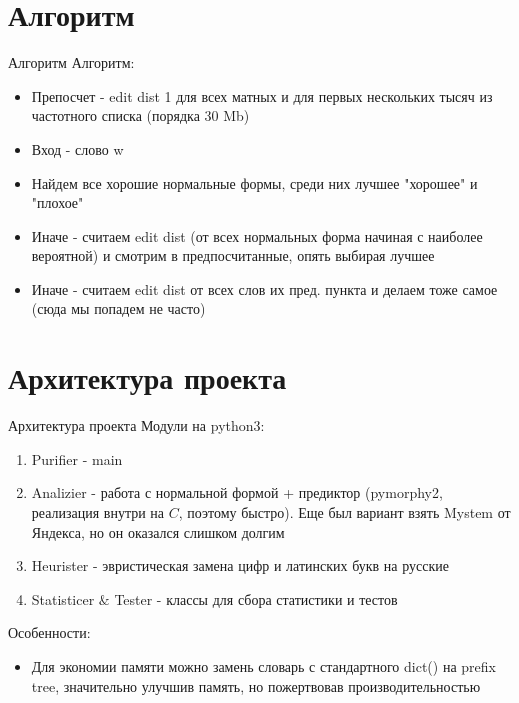 \documentclass{beamer}
\begin{document}
\section{Алгоритм}
\begin{frame}{Алгоритм}
    Алгоритм:
    \begin{itemize}
        \item Препосчет - edit dist 1 для всех матных и для первых нескольких тысяч из частотного списка (порядка 30 Mb)
        \item Вход - слово w
        \item Найдем все хорошие нормальные формы, среди них лучшее "хорошее" и "плохое"
        \item Иначе - считаем edit dist (от всех нормальных форма начиная с наиболее вероятной) и смотрим в предпосчитанные, опять выбирая лучшее
        \item Иначе - считаем edit dist от всех слов их пред. пункта и делаем тоже самое (сюда мы попадем не часто)
    \end{itemize}
\end{frame}

\section{Архитектура проекта}
\begin{frame}[t]{Архитектура проекта}
    Модули на python3:
    \begin{enumerate}
        \item Purifier - main
        \item Analizier - работа с нормальной формой + предиктор (pymorphy2, реализация внутри на $C$, поэтому быстро). Еще был вариант взять Mystem от Яндекса, но он оказался слишком долгим
        \item Heurister - эвристическая замена цифр и латинских букв на русские
        \item Statisticer $\&$ Tester - классы для сбора статистики и тестов
    \end{enumerate}
    Особенности:
    \begin{itemize}
        \item Для экономии памяти можно замень словарь с стандартного dict() на prefix tree, значительно улучшив память, но пожертвовав производительностью
    \end{itemize}
\end{frame}
\end{document}
